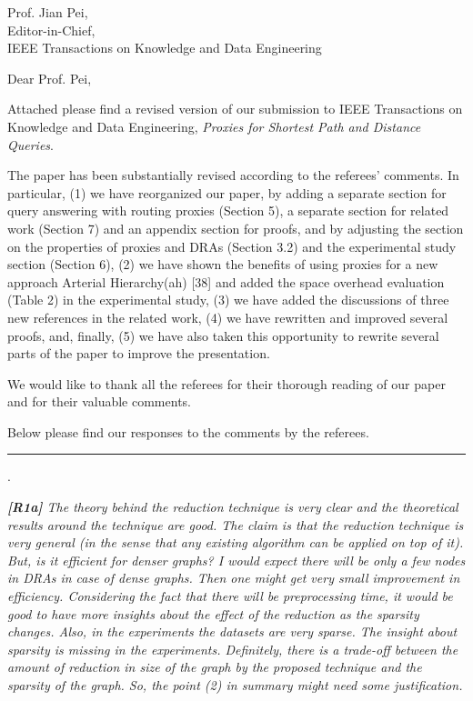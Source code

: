 \documentclass[11pt]{letter}
\date{}
\newcommand{\svs}{\vspace{0.36ex}}
\newcommand{\stitle}[1]{\vspace{0.5ex} \noindent{\bf #1}}
\newcommand{\ah}{{\sc ah}\xspace}
\begin{document}
\noindent
Prof. Jian Pei,\\
Editor-in-Chief,\\
IEEE Transactions on Knowledge and Data Engineering

\vspace{0.3cm}
\noindent
Dear Prof. Pei,


Attached please find a revised version of our submission to IEEE Transactions on Knowledge and Data Engineering,
{\em Proxies for Shortest Path and Distance Queries}.

The paper has been substantially revised according to the referees' comments. In particular,
%
(1) we have reorganized our paper, by adding a separate section for query answering with routing proxies (Section 5), a separate section for related work (Section 7) and an appendix section for proofs, and by adjusting the section on the properties of proxies and DRAs (Section 3.2) and the experimental study section (Section 6),
%
(2) we have shown the benefits of using proxies for a new approach Arterial Hierarchy(\ah) [38] and added the space overhead evaluation (Table 2) in the experimental study,
%
(3) we have added the discussions of three new references in the related work,
%
(4) we have rewritten and improved several proofs, and, finally,
%
(5) we have also taken this opportunity to rewrite several parts of the paper to improve the presentation.



We would like to thank all the referees for their thorough reading of our
paper and for their valuable comments.

Below please find our responses to the comments by the referees.

\vspace{3.6ex}
\hrule
\vspace{0.6ex}

\vspace{2ex} \stitle{Response to the comments of Referee 1}.

{\em
{\bf [R1a]} The theory behind the reduction technique is very clear and the theoretical results around the technique are good. The claim is that the reduction technique is very general
(in the sense that any existing algorithm can be applied on top of it).
But, is it efficient for denser graphs? I would expect there will be only a few nodes in DRAs in case of dense graphs. Then one might get very small improvement in efficiency. Considering
the fact that there will be preprocessing time, it would be good to have more insights about the effect of the reduction as the sparsity changes. Also, in the experiments the datasets are very sparse.
The insight about sparsity is missing in the experiments. Definitely, there is a trade-off between the amount of reduction in size of the graph by the proposed technique and the sparsity of the graph.
So, the point (2) in summary might need some justification.
}
\svs
\end{document}
